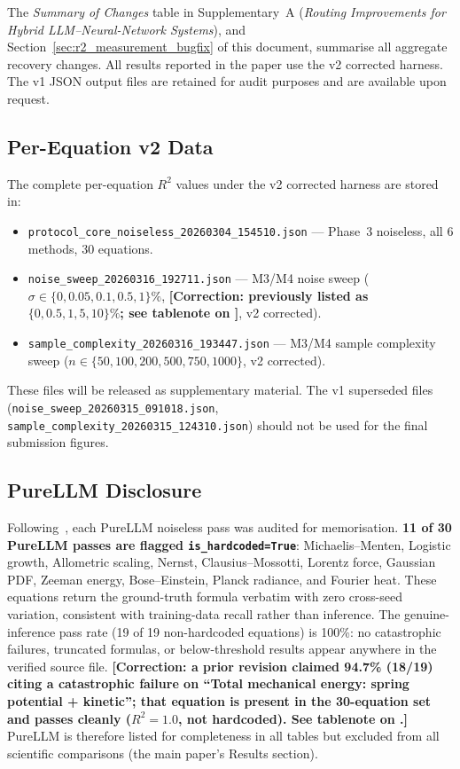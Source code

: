 \documentclass[twoside,11pt]{article}
\newcommand{\Rsq}{R^{2}}
\begin{document}
The \emph{Summary of Changes} table in Supplementary~A (\emph{Routing Improvements for Hybrid LLM--Neural-Network Systems}), and Section~\ref{sec:r2_measurement_bugfix} of this document, summarise all
aggregate recovery changes. All results reported in the paper use the
v2 corrected harness. The v1 JSON output files are retained for audit
purposes and are available upon request.

\subsection*{Per-Equation v2 Data}

The complete per-equation $R^2$ values under the v2 corrected harness are
stored in:
\begin{itemize}
  \item \texttt{protocol\_core\_noiseless\_20260304\_154510.json} —
    Phase~3 noiseless, all 6 methods, 30 equations.
  \item \texttt{noise\_sweep\_20260316\_192711.json} —
    M3/M4 noise sweep ($\sigma \in \{0, 0.05, 0.1, 0.5, 1\}\%$,
    \textbf{[Correction: previously listed as $\{0, 0.5, 1, 5, 10\}\%$;
    see tablenote on ]}, v2 corrected).
  \item \texttt{sample\_complexity\_20260316\_193447.json} —
    M3/M4 sample complexity sweep ($n \in \{50, 100, 200, 500, 750, 1000\}$,
    v2 corrected).
\end{itemize}
These files will be released as supplementary material. The v1 superseded
files (\texttt{noise\_sweep\_20260315\_091018.json},
\texttt{sample\_complexity\_20260315\_124310.json}) should not be used
for the final submission figures.

\subsection*{PureLLM Disclosure}

Following~\citet{memorization2024audit}, each PureLLM noiseless pass
was audited for memorisation. \textbf{11 of 30 PureLLM passes are
flagged \texttt{is\_hardcoded=True}}: Michaelis--Menten, Logistic growth,
Allometric scaling, Nernst, Clausius--Mossotti, Lorentz force, Gaussian PDF,
Zeeman energy, Bose--Einstein, Planck radiance, and Fourier heat. These
equations return the ground-truth formula verbatim with zero cross-seed
variation, consistent with training-data recall rather than inference.
The genuine-inference pass rate (19 of 19 non-hardcoded equations) is
100\%: no catastrophic failures, truncated formulas, or below-threshold
results appear anywhere in the verified source file.
\textbf{[Correction: a prior revision claimed 94.7\% (18/19) citing a
catastrophic failure on ``Total mechanical energy: spring potential +
kinetic''; that equation is present in the 30-equation set and passes
cleanly ($\Rsq=1.0$, not hardcoded). See tablenote on
.]}
PureLLM is therefore listed for completeness in all tables but excluded
from all scientific comparisons (the main paper's Results section).
\end{document}

